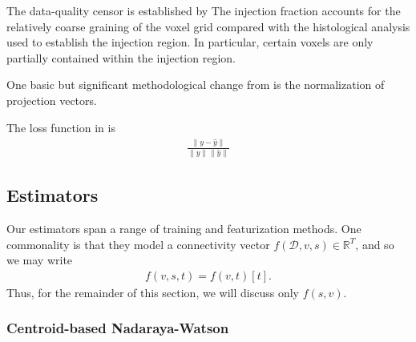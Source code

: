 The data-quality censor is established by 
The injection fraction accounts for the relatively coarse graining of the voxel grid compared with the histological analysis used to establish the injection region.  In particular, certain voxels are only partially contained within the injection region.


One basic but significant methodological change from \citet{Knox2019-ot} is the normalization of projection vectors.

\begin{comment}
\begin{figure}
    \centering
    \texttt{[image: ]}
    \caption{Caption}
    \label{fig:my_label}
\end{figure}
\end{comment}
The loss function in \citet{Knox2019-ot} is
\begin{eqnarray*}
\frac{\|y - \hat y\|} {\|y\|\|\hat y\|}
\end{eqnarray*}


\newpage
\subsection{Estimators}

Our estimators span a range of training and featurization methods.
One commonality is that they model a connectivity vector $f (\mathcal D, v,s)  \in \mathbb R^T$, and so we may write
\begin{eqnarray*}
f (v,s,t) = f (v,t)[t].
\end{eqnarray*}
Thus, for the remainder of this section, we will discuss only $f (s,v)$.

\subsubsection{Centroid-based Nadaraya-Watson}

